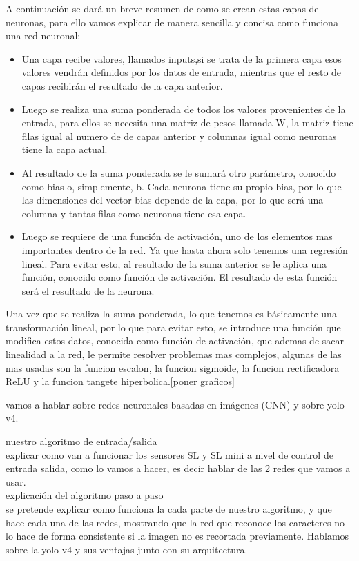 A continuación se dará un breve resumen de como se crean estas capas de neuronas, para ello vamos explicar de manera sencilla y concisa como funciona una red neuronal:
\begin{itemize}
    \item Una capa recibe valores, llamados inputs,si se trata de la primera capa esos valores vendrán definidos por los datos de entrada, mientras que el resto de capas recibirán el resultado de la capa anterior.
    \item Luego se realiza una suma ponderada de todos los valores provenientes de la entrada, para ellos se necesita una matriz de pesos llamada W, la matriz tiene filas igual al numero de de capas anterior y columnas igual como neuronas tiene la capa actual.
    \item Al resultado de la suma ponderada se le sumará otro parámetro, conocido como bias o, simplemente, b. Cada neurona tiene su propio bias, por lo que las dimensiones del vector bias depende de la capa, por lo que será una columna y tantas filas como neuronas tiene esa capa.
    \item Luego se requiere de una función de activación, uno de los elementos mas importantes dentro de la red. Ya que hasta ahora solo tenemos una regresión lineal. Para evitar esto, al resultado de la suma anterior se le aplica una función, conocido como función de activación. El resultado de esta función será el resultado de la neurona.
\end{itemize}

Una vez que se realiza la suma ponderada, lo que tenemos es básicamente una transformación lineal, por lo que para evitar esto, se introduce una función que modifica estos datos, conocida como función de activación, que ademas de sacar linealidad a la red, le permite resolver problemas mas complejos, algunas de las mas usadas son la funcion escalon, la funcion sigmoide, la funcion rectificadora ReLU y la funcion tangete hiperbolica.[poner graficos]


vamos a hablar sobre redes neuronales basadas en imágenes (CNN) y sobre yolo v4.

nuestro algoritmo de entrada/salida \\

explicar como van a funcionar los sensores SL y SL mini a nivel de control de entrada salida,
como lo vamos a hacer, es decir hablar de las 2 redes que vamos a usar. \\



explicación del algoritmo paso a paso \\

se pretende explicar como funciona la cada parte de nuestro algoritmo, y que hace cada una de las redes, mostrando que la red que reconoce los caracteres no lo hace de forma consistente si la imagen no es recortada previamente. Hablamos sobre la yolo v4 y sus ventajas junto con su arquitectura.

